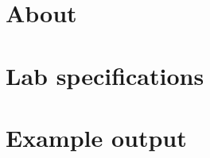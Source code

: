 
\newcommand{\laClass}       {CS 250}
\newcommand{\laSemester}    {Spring 2018}
\newcommand{\laChapter}     {}
\newcommand{\laType}        {Project}
\newcommand{\laAssignment}  {1}
\newcommand{\laPoints}      {5}
\newcommand{\laTitle}       {Doing a thing}
\newcommand{\laStarterFiles}{Download from GitHub.}
\newcommand{\laTopics}      {Stuff, stuff, and stuff.}
\setcounter{chapter}{1}
\setcounter{section}{1}
\addtocounter{section}{-1}
\toggletrue{answerkey}
\togglefalse{answerkey}





    \section{About}

    \section{Lab specifications}

    \section{Example output}



